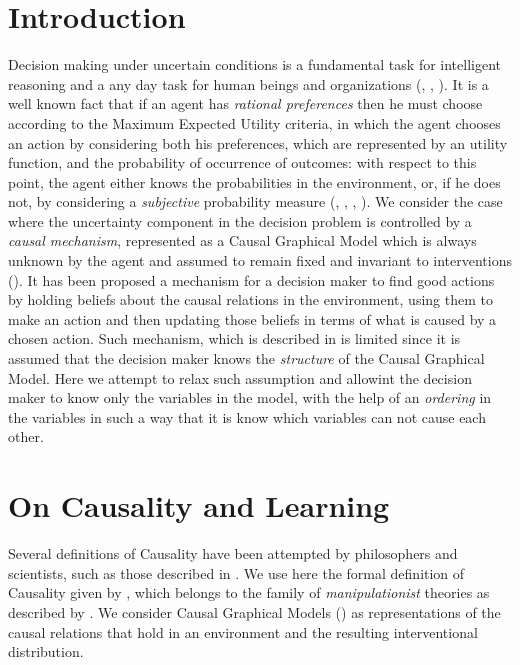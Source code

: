 \documentclass[letterpaper]{article}
\begin{document}
\section{Introduction}
Decision making under uncertain conditions is a fundamental task for intelligent reasoning and a any day task for human beings and organizations (\cite{savage1954the}, \cite{danks2014unifying}, \cite{lake2017building}). It is a well known fact that if an agent has \textit{rational preferences} then he must choose according to the Maximum Expected Utility criteria, in which the agent chooses an action by considering both his preferences, which are represented by an utility function, and the probability of occurrence of outcomes: with respect to this point, the agent either knows the probabilities in the environment, or, if he does not, by considering a \textit{subjective} probability measure (\cite{von1944theory}, \cite{savage1954the}, \cite{bernardo2000bayesian}, \cite{gilboa2009decision}). We consider the case where the uncertainty component in the decision problem is controlled by a \textit{causal mechanism}, represented as a Causal Graphical Model which is always unknown by the agent and assumed to remain fixed and invariant to interventions (\cite{woodward2005making}). It has been proposed a mechanism for a decision maker to find good actions by holding beliefs about the causal relations in the environment, using them to make an action and then updating those beliefs in terms of what is caused by a chosen action. Such mechanism, which is described in \cite{gonzalez2018playing} is limited since it is assumed that the decision maker knows the \textit{structure} of the Causal Graphical Model. Here we attempt to relax such assumption and allowint the decision maker to know only the variables in the model, with the help of an \textit{ordering} in the variables in such a way that it is know which variables can not cause each other. 

\section{On Causality and Learning}
Several definitions of Causality have been attempted by philosophers and scientists, such as those described in \cite{holland1986statistics}. We use here the formal definition of Causality given by \cite{spirtes2000causation}, which belongs to the family of \textit{manipulationist} theories as described by \cite{woodward2005making}. We consider Causal Graphical Models (\cite{koller2009probabilistic}) as representations of the causal relations that hold in an environment and the resulting interventional distribution.
\end{document}
